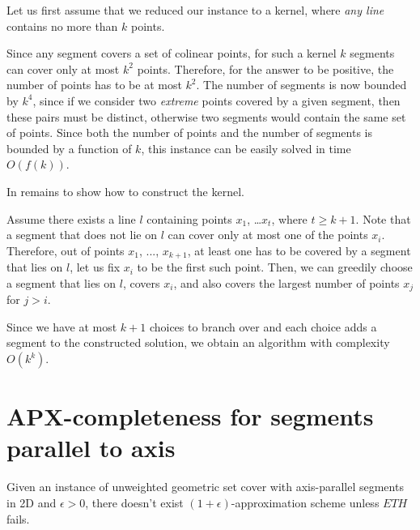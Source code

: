 Let us first assume that we reduced our instance to a kernel,
where \textit{any line} contains no more than $k$ points.

Since any segment covers a set of colinear points,
for such a kernel $k$ segments can cover only at most $k^2$ points.
Therefore, for the answer to be positive,
the number of points has to be at most $k^2$.
The number of segments is now bounded by $k^4$,
since if we consider two \textit{extreme} points
covered by a given segment,
then these pairs must be distinct,
otherwise two segments would contain the same set of points.
Since both the number of points and the number of segments
is bounded by a function of $k$,
this instance can be easily solved in time $O(f(k))$.

In remains to show how to construct the kernel.




Assume there exists a line $l$ containing points $x_1$, \ldots $x_t$,
where $t \geq k + 1$.
Note that a segment that does not lie on $l$ can cover only at most one
of the points $x_i$.
Therefore, out of points $x_1$, ..., $x_{k+1}$,
at least one has to be covered by a segment that lies on $l$,
let us fix $x_i$ to be the first such point.
Then, we can greedily choose a segment that lies on $l$,
covers $x_i$,
and also covers the largest number of points $x_j$ for $j > i$.

Since we have at most $k + 1$ choices to branch over
and each choice adds a segment to the constructed solution,
we obtain an algorithm with complexity $O(k^k)$.

\section{APX-completeness for segments parallel to axis}
\label{section:segment_apx}

\begin{tw}{
	Given an instance of unweighted geometric set cover
	with axis-parallel segments in 2D and $\epsilon>0$, there doesn't
	exist $(1+\epsilon)$-approximation scheme unless $ETH$ fails.
}\end{tw}

